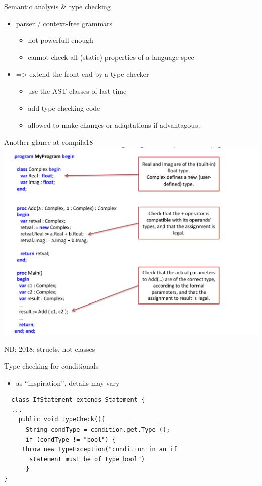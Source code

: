 \documentclass{beamer}
\begin{document}
\begin{frame}[label={sec:org66c2b13}]{Semantic analysis \& type checking}
\begin{itemize}
\item parser / context-free  grammars 
\begin{itemize}
\item not powerfull enough
\item cannot check all (static) properties of a language spec
\end{itemize}

\item => extend the front-end by a type checker

\begin{itemize}
\item use the AST classes of last time
\item add type checking code
\item allowed to make \alert{changes} or adaptations if advantagous.
\end{itemize}
\end{itemize}
\end{frame}


\begin{frame}[label={sec:orgecc05aa}]{Another glance at compila18}
\includegraphics[width=\textwidth]{figures/snaps/compilaexample-checking}


NB: 2018: structs, not classes 
\end{frame}


\begin{frame}[fragile,plain,label={sec:orgc3ce688}]{Type checking for conditionals}
 \begin{itemize}
\item as ``inspiration'', details may vary
\end{itemize}


\lstset{language=java,label= ,caption= ,captionpos=b,numbers=none}
\begin{lstlisting}
  class IfStatement extends Statement {
  ...
    public void typeCheck(){
      String condType = condition.get.Type ();
      if (condType != "bool") {  
	 throw new TypeException("condition in an if 
	   statement must be of type bool")
      }
}
\end{lstlisting}
\end{frame}
\end{document}
